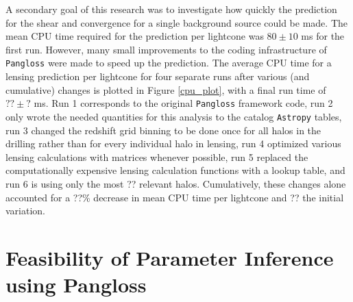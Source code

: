 \documentclass[%
 reprint,
 amsmath,amssymb,
 aps,nofootinbib
]{revtex4-1}
\begin{document}
A secondary goal of this research was to investigate how quickly the prediction for the shear and convergence for a single background source could be made. The mean CPU time required for the prediction per lightcone was ${80\pm10}$ ms for the first run. However, many small improvements to the coding infrastructure of \texttt{Pangloss} were made to speed up the prediction. The average CPU time for a lensing prediction per lightcone for four separate runs after various (and cumulative) changes is plotted in Figure \ref{cpu_plot}, with a final run time of $??\pm?$ ms. Run 1 corresponds to the original \texttt{Pangloss} framework code, run 2 only wrote the needed quantities for this analysis to the catalog \texttt{Astropy} tables, run 3 changed the redshift grid binning to be done once for all halos in the drilling rather than for every individual halo in lensing, run 4 optimized various lensing calculations with matrices whenever possible, run 5 replaced the computationally expensive lensing calculation functions with a lookup table, and run 6 is using only the most ?? relevant halos. Cumulatively, these changes alone accounted for a ??\% decrease in mean CPU time per lightcone and ?? the initial variation.


\section{Feasibility of Parameter Inference using Pangloss}
\end{document}
